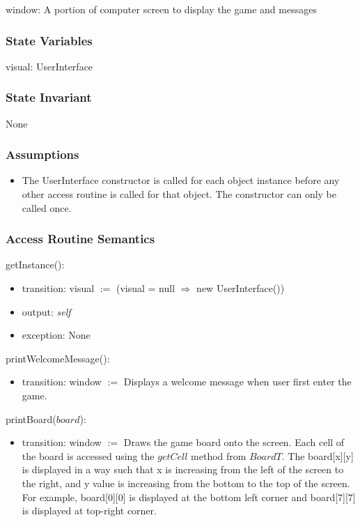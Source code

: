 \documentclass[12pt]{article}
\begin{document}
window: A portion of computer screen to display the game and messages

\subsubsection* {State Variables}

visual: UserInterface

\subsubsection* {State Invariant}

None

\subsubsection* {Assumptions}

\begin{itemize}
\item The UserInterface constructor is called for each object instance before any
other access routine is called for that object.  The constructor can only be
called once.
\end{itemize}

\subsubsection* {Access Routine Semantics}

\noindent getInstance():
\begin{itemize}
  \item transition: visual $:=$ (visual = null $\Rightarrow$ new UserInterface())
  \item output: \textit{self}
  \item exception: None
\end{itemize}

\noindent printWelcomeMessage():
\begin{itemize}
\item transition: window $:=$ Displays a welcome message when user first enter the game.
\end{itemize}

\noindent printBoard($board$):
\begin{itemize}
\item transition: window $:=$ Draws the game board onto the screen. Each cell of the board
                  is accessed using the $getCell$ method from $BoardT$. The board[x][y] is displayed 
                  in a way such that x is increasing from the left of the screen to the right,
                  and y value is increasing from the bottom to the top of the screen. For example,
                  board[0][0] is displayed at the bottom left corner and board[7][7] is displayed 
                  at top-right corner. 
\end{itemize}
\end{document}
